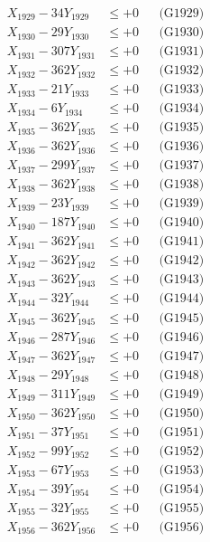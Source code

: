 \documentclass[a4paper,10pt]{article}
\begin{document}
{\begin{align}
X_{1929} - 34Y_{1929} &\leq +0 && \text{(G1929)} \\
X_{1930} - 29Y_{1930} &\leq +0 && \text{(G1930)} \\
\allowbreak
X_{1931} - 307Y_{1931} &\leq +0 && \text{(G1931)} \\
X_{1932} - 362Y_{1932} &\leq +0 && \text{(G1932)} \\
X_{1933} - 21Y_{1933} &\leq +0 && \text{(G1933)} \\
X_{1934} - 6Y_{1934} &\leq +0 && \text{(G1934)} \\
X_{1935} - 362Y_{1935} &\leq +0 && \text{(G1935)} \\
X_{1936} - 362Y_{1936} &\leq +0 && \text{(G1936)} \\
X_{1937} - 299Y_{1937} &\leq +0 && \text{(G1937)} \\
X_{1938} - 362Y_{1938} &\leq +0 && \text{(G1938)} \\
X_{1939} - 23Y_{1939} &\leq +0 && \text{(G1939)} \\
X_{1940} - 187Y_{1940} &\leq +0 && \text{(G1940)} \\
\allowbreak
X_{1941} - 362Y_{1941} &\leq +0 && \text{(G1941)} \\
X_{1942} - 362Y_{1942} &\leq +0 && \text{(G1942)} \\
X_{1943} - 362Y_{1943} &\leq +0 && \text{(G1943)} \\
X_{1944} - 32Y_{1944} &\leq +0 && \text{(G1944)} \\
X_{1945} - 362Y_{1945} &\leq +0 && \text{(G1945)} \\
X_{1946} - 287Y_{1946} &\leq +0 && \text{(G1946)} \\
X_{1947} - 362Y_{1947} &\leq +0 && \text{(G1947)} \\
X_{1948} - 29Y_{1948} &\leq +0 && \text{(G1948)} \\
X_{1949} - 311Y_{1949} &\leq +0 && \text{(G1949)} \\
X_{1950} - 362Y_{1950} &\leq +0 && \text{(G1950)} \\
\allowbreak
X_{1951} - 37Y_{1951} &\leq +0 && \text{(G1951)} \\
X_{1952} - 99Y_{1952} &\leq +0 && \text{(G1952)} \\
X_{1953} - 67Y_{1953} &\leq +0 && \text{(G1953)} \\
X_{1954} - 39Y_{1954} &\leq +0 && \text{(G1954)} \\
X_{1955} - 32Y_{1955} &\leq +0 && \text{(G1955)} \\
X_{1956} - 362Y_{1956} &\leq +0 && \text{(G1956)} \\

\end{align}}
\end{document}
